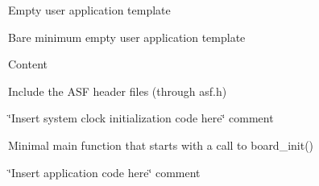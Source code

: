 \begin{DoxyParagraph}{Empty user application template}

\end{DoxyParagraph}
Bare minimum empty user application template

\begin{DoxyParagraph}{Content}

\end{DoxyParagraph}

\begin{DoxyEnumerate}
\item Include the ASF header files (through asf.\+h)
\item \char`\"{}\+Insert system clock initialization code here\char`\"{} comment
\item Minimal main function that starts with a call to board\+\_\+init()
\item \char`\"{}\+Insert application code here\char`\"{} comment 
\end{DoxyEnumerate}